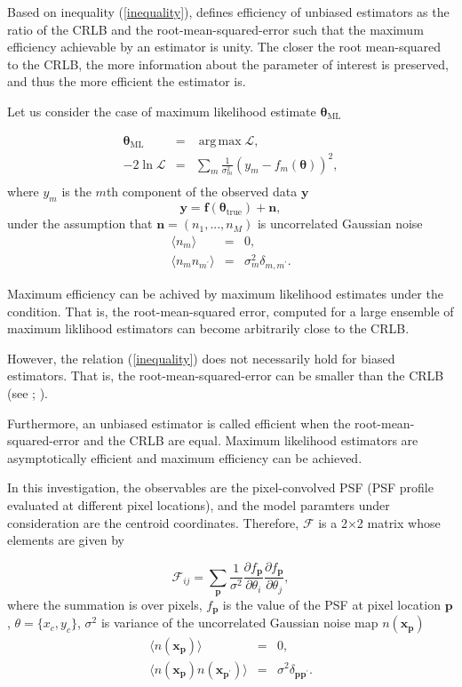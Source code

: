 \documentclass[12pt, preprint]{aastex}
\DeclareMathOperator*{\argmax}{arg\,max}
\newcommand{\beq}{\begin{equation}}
\newcommand{\eeq}{\end{equation}}
\begin{document}
Based on inequality (\ref{inequality}), \citet{cramer} defines efficiency of unbiased 
estimators as the ratio of the CRLB and the root-mean-squared-error such that the maximum efficiency 
achievable by an estimator is unity. The closer the root mean-squared 
to the CRLB, the more information about the parameter of interest is preserved, and thus the more efficient 
the estimator is. 

Let us consider the case of maximum likelihood estimate $\boldsymbol{\mathbf{\theta}}_{\text{ML}}$

\begin{eqnarray}
\boldsymbol{\mathbf{\theta}}_{\text{ML}} &=& \argmax \mathcal{L}, \\
-2\ln \mathcal{L} &=& \sum_{m}\frac{1}{\sigma_{m}^{2}}( y_{m} - f_{m}(\boldsymbol{\mathbf{\theta}}))^{2}, \\
\end{eqnarray}
where $y_{m}$ is the $m$th component of the observed data $\mathbf{y}$
\beq
\mathbf{y} = \mathbf{f}(\boldsymbol{\mathbf{\theta}}_{\text{true}}) + \mathbf{n},
\eeq
under the assumption that $\mathbf{n} = (n_{1}, ... , n_{M})$ is uncorrelated Gaussian noise
\begin{eqnarray}
\langle n_{m} \rangle &=& 0, \\
\langle n_{m}n_{m^{\prime}} \rangle &=& \sigma_{m}^{2}\delta_{m,m^{\prime}}. 
\end{eqnarray}


Maximum efficiency can be achived by maximum likelihood estimates under the condition. That is, 
the root-mean-squared error, computed for a large ensemble of maximum liklihood estimators can become 
arbitrarily close to the CRLB. 


However, the relation (\ref{inequality}) does not necessarily hold for biased estimators. That is, 
the root-mean-squared-error can be smaller than the CRLB (see \citet{lecam}; \citet{hodge}). 

Furthermore, an unbiased estimator is called efficient when the root-mean-squared-error 
and the CRLB are equal. Maximum likelihood estimators are asymptotically efficient and maximum 
efficiency can be achieved. 
 
In this investigation, the observables are the pixel-convolved PSF (PSF profile evaluated at different pixel locations), and  
the model paramters under consideration are the centroid coordinates. Therefore, $\mathcal{F}$
is a 2$\times$2 matrix whose elements are given by

\beq
  \mathcal{F}_{ij} = \sum_{\mathbf{p}}\frac{1}{\sigma^{2}}
                \frac{\partial f_{\mathbf{p}}}{\partial \theta_{i}}\frac{\partial f_{\mathbf{p}}}{\partial \theta_{j}},
\label{fish}
\eeq
where the summation is over pixels, $f_{\mathbf{p}}$ is the value of the PSF at pixel location $\mathbf{p}$,
$\theta=\{x_{c},y_{c}\}$, $\sigma^{2}$ is variance of the uncorrelated Gaussian noise map $n(\mathbf{x_{p}})$
\begin{eqnarray}
\langle n(\mathbf{x_{p}}) \rangle &=& 0, \\
\langle n(\mathbf{x_{p}})n(\mathbf{x_{p^{\prime}}}) \rangle &=& \sigma^{2}\delta_{\mathbf{p}\mathbf{p}^{\prime}}. 
\end{eqnarray}
\end{document}
